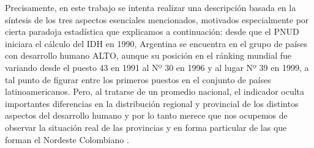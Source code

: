 Precisamente, en este trabajo se intenta realizar una descripción basada en la síntesis de los tres aspectos esenciales mencionados, motivados especialmente por cierta paradoja estadística que explicamos a continuación: desde que el PNUD iniciara el cálculo del IDH en 1990, Argentina se encuentra en el grupo de países con desarrollo humano ALTO, aunque su posición en el ránking mundial fue variando desde el puesto 43 en 1991 al Nº 30 en 1996 y al lugar Nº 39 en 1999, a tal punto de figurar entre los primeros puestos en el conjunto de países latinoamericanos. Pero, al tratarse de un promedio nacional, el indicador oculta importantes diferencias en la distribución regional y provincial de los distintos aspectos del desarrollo humano y por lo tanto merece que nos ocupemos de observar la situación real de las provincias y en forma particular de las que forman el Nordeste Colombiano \cite{konrad-adenauer-stiftung_indice_2003} . 

\endinput
